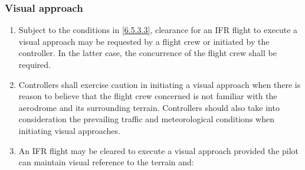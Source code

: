 \documentclass[../main.tex]{subfiles}
\begin{document}
    \subsubsection{Visual approach}

    \begin{enumerate}
        \item Subject to the conditions in \ref{6.5.3.3}, clearance for an IFR flight to execute a visual approach may be requested by a flight crew or initiated by the controller. In the latter case, the concurrence of the flight crew shall be required.
        \item Controllers shall exercise caution in initiating a visual approach when there is reason to believe that the flight crew concerned is not familiar with the aerodrome and its surrounding terrain. Controllers should also take into consideration the prevailing traffic and meteorological conditions when initiating visual approaches.
        \item \label{6.5.3.3} An IFR flight may be cleared to execute a visual approach provided the pilot can maintain visual reference to the terrain and:



\end{enumerate}
\end{document}
